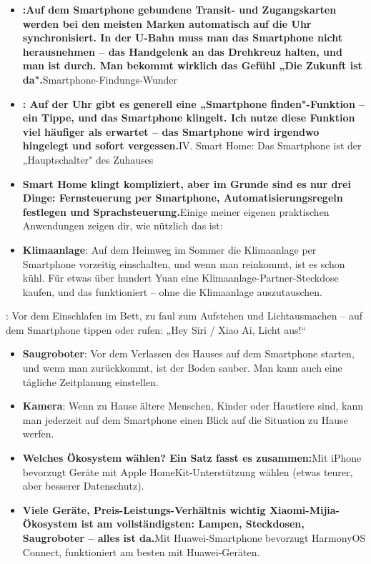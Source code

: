 \begin{itemize}
  \item \textbf{:Auf dem Smartphone gebundene Transit- und Zugangskarten werden bei den meisten Marken automatisch auf die Uhr synchronisiert. In der U-Bahn muss man das Smartphone nicht herausnehmen – das Handgelenk an das Drehkreuz halten, und man ist durch. Man bekommt wirklich das Gefühl „Die Zukunft ist da".}Smartphone-Findungs-Wunder
  \item \textbf{: Auf der Uhr gibt es generell eine „Smartphone finden"-Funktion – ein Tippe, und das Smartphone klingelt. Ich nutze diese Funktion viel häufiger als erwartet – das Smartphone wird irgendwo hingelegt und sofort vergessen.}IV. Smart Home: Das Smartphone ist der „Hauptschalter" des Zuhauses
  \item \textbf{Smart Home klingt kompliziert, aber im Grunde sind es nur drei Dinge: Fernsteuerung per Smartphone, Automatisierungsregeln festlegen und Sprachsteuerung.}Einige meiner eigenen praktischen Anwendungen zeigen dir, wie nützlich das ist:
  \item \textbf{Klimaanlage}: Auf dem Heimweg im Sommer die Klimaanlage per Smartphone vorzeitig einschalten, und wenn man reinkommt, ist es schon kühl. Für etwas über hundert Yuan eine Klimaanlage-Partner-Steckdose kaufen, und das funktioniert – ohne die Klimaanlage auszutauschen.
\end{itemize}


: Vor dem Einschlafen im Bett, zu faul zum Aufstehen und Lichtausmachen – auf dem Smartphone tippen oder rufen: „Hey Siri / Xiao Ai, Licht aus!“

\begin{itemize}
  \item \textbf{Saugroboter}: Vor dem Verlassen des Hauses auf dem Smartphone starten, und wenn man zurückkommt, ist der Boden sauber. Man kann auch eine tägliche Zeitplanung einstellen.
  \item \textbf{Kamera}: Wenn zu Hause ältere Menschen, Kinder oder Haustiere sind, kann man jederzeit auf dem Smartphone einen Blick auf die Situation zu Hause werfen.
  \item \textbf{Welches Ökosystem wählen? Ein Satz fasst es zusammen:}Mit iPhone bevorzugt Geräte mit Apple HomeKit-Unterstützung wählen (etwas teurer, aber besserer Datenschutz).
  \item \textbf{Viele Geräte, Preis-Leistungs-Verhältnis wichtig Xiaomi-Mijia-Ökosystem ist am vollständigsten: Lampen, Steckdosen, Saugroboter – alles ist da.}Mit Huawei-Smartphone bevorzugt HarmonyOS Connect, funktioniert am besten mit Huawei-Geräten.
\end{itemize}

